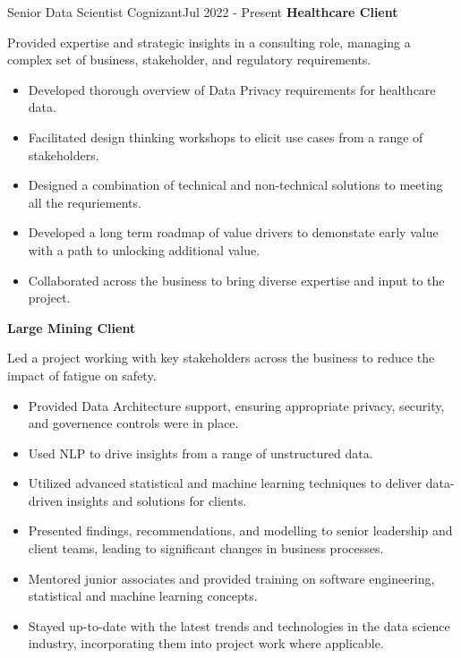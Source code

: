 
\begin{cventry}{Senior Data Scientist} {Cognizant}{}{Jul 2022 - Present}
  \textbf{Healthcare Client}

  Provided expertise and strategic insights in a consulting role, 
  managing a complex set of business, stakeholder, and regulatory requirements.

  \begin{itemize}
    \item Developed thorough overview of Data Privacy requirements for healthcare data.
    \item Facilitated design thinking workshops to elicit use cases from a range of stakeholders.
    \item Designed a combination of technical and non-technical solutions to meeting all the requriements.
    \item Developed a long term roadmap of value drivers to demonstate early value with a path to unlocking additional value.
    \item Collaborated across the business to bring diverse expertise and input to the project.
  \end{itemize}

  \textbf{Large Mining Client}

  Led a project working with key stakeholders across the business to reduce the impact of fatigue on safety.
  \begin{itemize}
    \item Provided Data Architecture support, ensuring appropriate privacy, security, and governence controls were in place.
    \item Used NLP to drive insights from a range of unstructured data.
    \item Utilized advanced statistical and machine learning techniques to deliver data-driven insights and solutions for clients.
    \item Presented findings, recommendations, and modelling to senior leadership and client teams, 
      leading to significant changes in business processes.
    \item Mentored junior associates and provided training on software engineering, statistical and machine learning concepts.
    \item Stayed up-to-date with the latest trends and technologies in the data science industry, incorporating them into project work where applicable.
  \end{itemize}
\end{cventry}

